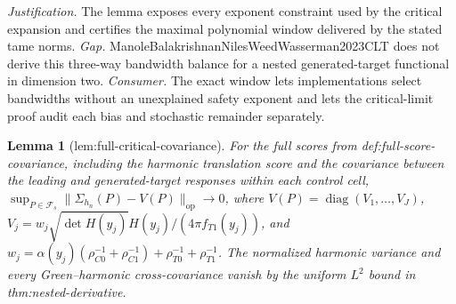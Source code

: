 \documentclass{article}
\newtheorem{lemma}{Lemma}
\begin{document}
\par\smallskip\noindent \textit{Justification.} The lemma exposes every exponent constraint used by the critical expansion and certifies the maximal polynomial window delivered by the stated tame norms. \textit{Gap.} ManoleBalakrishnanNilesWeedWasserman2023CLT does not derive this three-way bandwidth balance for a nested generated-target functional in dimension two. \textit{Consumer.} The exact window lets implementations select bandwidths without an unexplained safety exponent and lets the critical-limit proof audit each bias and stochastic remainder separately.

\begin{lemma}[lem:full-critical-covariance]\label{lem:full-critical-covariance}
For the full scores from def:full-score-covariance, including the harmonic translation score and the covariance between the leading and generated-target responses within each control cell, \(\sup_{P\in\mathcal F_s}\lVert\Sigma_{h_n}(P)-V(P)\rVert_{\mathrm{op}}\to0\), where \(V(P)=\operatorname{diag}(V_1,\ldots,V_J)\), \(V_j=w_j\sqrt{\det H(y_j)}H(y_j)/(4\pi f_{T1}(y_j))\), and \(w_j=\alpha(y_j)(\rho_{C0}^{-1}+\rho_{C1}^{-1})+\rho_{T0}^{-1}+\rho_{T1}^{-1}\). The normalized harmonic variance and every Green--harmonic cross-covariance vanish by the uniform \(L^2\) bound in thm:nested-derivative.
\end{lemma}
\end{document}
